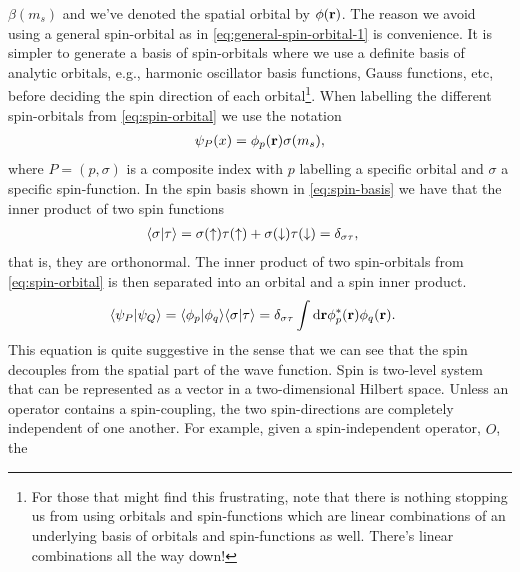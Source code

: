         $\beta(m_s)$ and we've denoted the spatial orbital by $\phi(\mathbf{r})$.
        The reason we avoid using a general spin-orbital as in
        \autoref{eq:general-spin-orbital-1} is convenience.
        It is simpler to generate a basis of spin-orbitals where we use a
        definite basis of analytic orbitals, e.g., harmonic oscillator basis
        functions, Gauss functions, etc, before deciding the spin direction of
        each orbital\footnote{
            For those that might find this frustrating, note that there is
            nothing stopping us from using orbitals and spin-functions which are
            linear combinations of an underlying basis of orbitals and
            spin-functions as well.
            There's linear combinations all the way down!
        }.
        When labelling the different spin-orbitals from
        \autoref{eq:spin-orbital} we use the notation
        \begin{align}
            \psi_P(x) = \phi_p(\mathbf{r})\sigma(m_s),
        \end{align}
        where $P = (p, \sigma)$ is a composite index with $p$ labelling a
        specific orbital and $\sigma$ a specific spin-function.
        In the spin basis shown in \autoref{eq:spin-basis} we have that the
        inner product of two spin functions
        \begin{align}
            \langle \sigma | \tau \rangle
            &=
            \sigma(\uparrow)\tau(\uparrow)
            + \sigma(\downarrow)\tau(\downarrow)
            = \delta_{\sigma\tau},
        \end{align}
        that is, they are orthonormal.
        The inner product of two spin-orbitals from \autoref{eq:spin-orbital} is
        then separated into an orbital and a spin inner product.
        \begin{align}
            \langle \psi_P | \psi_Q \rangle
            &= \langle \phi_p | \phi_q \rangle\langle \sigma | \tau \rangle
            = \delta_{\sigma\tau}
            \int\mathrm{d}\mathbf{r}\phi^{*}_{p}(\mathbf{r})\phi_{q}(\mathbf{r}).
            \label{eq:inner-spin-orbital}
        \end{align}
        This equation is quite suggestive in the sense that we can see that the
        spin decouples from the spatial part of the wave function.
        Spin is two-level system that can be represented as a vector in a
        two-dimensional Hilbert space.
        Unless an operator contains a spin-coupling, the two spin-directions are
        completely independent of one another.
        For example, given a spin-independent operator, $\hat{O}$, the
